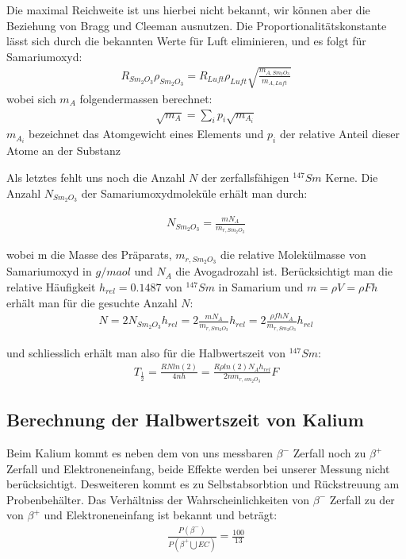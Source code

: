 \documentclass[12pt]{article}
\begin{document}
Die maximal Reichweite ist uns hierbei nicht bekannt, wir können aber die Beziehung von Bragg und Cleeman ausnutzen. Die Proportionalitätskonstante lässt sich durch die bekannten Werte für Luft eliminieren, und es folgt für Samariumoxyd:
\begin{align}
 R_{Sm_2O_3} \rho_{Sm_2O_3} = R_{Luft} \rho_{Luft} \sqrt{\frac{m_{A,Sm_2O_3}}{m_{A,Luft}}}
\end{align}
wobei sich $m_A$ folgendermassen berechnet:
\begin{align}
 \sqrt{m_A}=\sum \limits_i p_i \sqrt{m_{A_i}}
\end{align}
$m_{A_i}$ bezeichnet das Atomgewicht eines Elements und $p_i$ der relative Anteil dieser Atome an der Substanz

Als letztes fehlt uns noch die Anzahl $N$ der zerfallsfähigen $^{147}Sm$ Kerne. Die Anzahl $N_{Sm_2O_3}$ der Samariumoxydmoleküle erhält man durch:

\begin{align}
 N_{Sm_2O_3} = \frac{m N_A}{m_{r,Sm_2O_3}}
\end{align}

wobei m die Masse des Präparats, $m_{r,Sm_2O_3}$ die relative Molekülmasse von Samariumoxyd in $g/maol$ und $N_A$ die Avogadrozahl ist.
Berücksichtigt man die relative Häufigkeit $h_{rel} = 0.1487$ von $^{147}Sm$ in Samarium und $m = \rho V = \rho F h$ erhält man für die gesuchte Anzahl $N$:
\begin{align}
 N=2N_{Sm_2O_3} h_{rel}= 2 \frac{m N_A}{m_{r,Sm_2O_3}} h_{rel}=2 \frac{\rho f h N_A}{m_{r,Sm_2O_3}}h_{rel}
\end{align}

und schliesslich erhält man also für die Halbwertszeit von $^{147}Sm$:
\begin{align}
 T_{\frac{1}{2}} = \frac{R N ln(2)}{4 n h} = \frac{R \rho ln (2) N_A h_{rel}}{2n m_{r,sm_2O_3}} F
\end{align}

\subsection{Berechnung der Halbwertszeit von Kalium}

Beim Kalium kommt es neben dem von uns messbaren $\beta^-$ Zerfall noch
 zu $\beta^+$ Zerfall und Elektroneneinfang, beide Effekte werden bei unserer
 Messung nicht berücksichtigt. Desweiteren kommt es zu Selbstabsorbtion und Rückstreuung 
am Probenbehälter. Das Verhältniss der Wahrscheinlichkeiten von $\beta^-$ Zerfall zu der
 von $\beta^+$ und Elektroneneinfang ist bekannt und beträgt:
\begin{align}
 \frac{P(\beta^-)}{P(\beta^+ \bigcup EC)} = \frac{100}{13}
\end{align}
\end{document}
